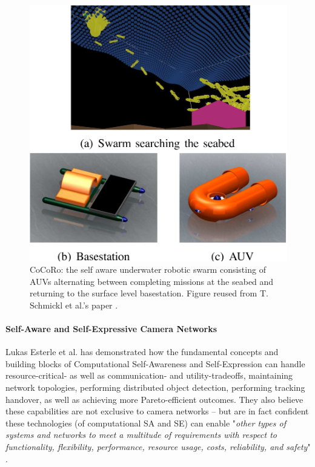 			\begin{figure}[!ht]
			\centering
			\includegraphics[width=0.8\columnwidth]{Assets/DocSegments/Chapters/Background/Figures/Schema/cocoro.PNG}
			\caption[CoCoRo: the self aware underwater robotic AUV swarm.]{CoCoRo: the self aware underwater robotic swarm consisting of AUVs alternating between completing missions at the seabed and returning to the surface level basestation. Figure reused from T. Schmickl et al.'s paper \cite{cocoro}.}
			\label{fig:cocoro}
			\end{figure}

			\paragraph{Self-Aware and Self-Expressive Camera Networks \nl}

			Lukas Esterle et al. \cite{esterle_camera} has demonstrated how the fundamental concepts and building blocks of Computational Self-Awareness and Self-Expression can handle resource-critical- as well as communication- and utility-tradeoffs, maintaining network topologies, performing distributed object detection, performing tracking handover, as well as achieving more Pareto-efficient outcomes. They also believe these capabilities are not exclusive to camera networks -- but are in fact confident these technologies (of computational SA and SE) can enable "\textit{other types of systems and networks to meet a multitude of requirements with respect to functionality, flexibility, performance, resource usage, costs, reliability, and safety}" \cite{esterle_camera}.
			
